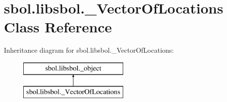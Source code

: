 \hypertarget{classsbol_1_1libsbol_1_1___vector_of_locations}{}\section{sbol.\+libsbol.\+\_\+\+Vector\+Of\+Locations Class Reference}
\label{classsbol_1_1libsbol_1_1___vector_of_locations}
Inheritance diagram for sbol.\+libsbol.\+\_\+\+Vector\+Of\+Locations\+:\begin{figure}[H]
\begin{center}
\leavevmode
\includegraphics[height=2.000000cm]{classsbol_1_1libsbol_1_1___vector_of_locations}
\end{center}
\end{figure}

